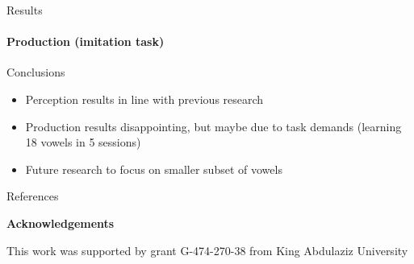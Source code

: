 \documentclass[final,xcolor={cmyk,hyperref}]{beamer}
\makeatletter
\def\tikzfigureref#1{\hskip0.125ex
\tikz[baseline=(@.base)]\node[figure label,
anchor=base, inner sep=0.333ex, font=\small\bfseries]{\csname tikzfigure@label@#1\endcsname};
}
\makeatother
\begin{document}
\begin{frame}[t]
\begin{columns}[t]
\begin{column}{0.525\linewidth}
\begin{block}{Results}
\begin{itemize}
\end{itemize}

\paragraph{Production (imitation task)}

  \end{block}





\begin{block}{Conclusions}

\begin{itemize}
  \item Perception results in line with previous research
  \item Production results disappointing,
  but maybe due to task demands (learning 18 vowels in 5 sessions)
  \item Future research to focus on smaller subset of vowels
\end{itemize}
\end{block}

\begin{block}{References}
  \renewcommand\bibfont{\tiny}
  \printbibliography
\end{block}

\textbf{Acknowledgements}

  This work was supported by
  grant G-474-270-38 from King Abdulaziz University

\end{column}

\end{columns}

\end{frame}
\end{document}
